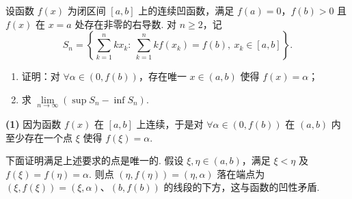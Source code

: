 设函数 $f(x)$ 为闭区间 $[a,b]$ 上的连续凹函数，满足 $f(a)=0$，$f(b)>0$ 且 $f(x)$ 在 $x=a$ 处存在非零的右导数. 对 $n\ge 2$，记
\[
  S_n=\left\{\sum_{k=1}^{n}kx_k:\ \sum_{k=1}^{n}kf(x_k)=f(b),\ x_k\in[a,b]\right\}.
\]
\begin{enumerate}
  \item 证明：对 $\forall\alpha\in(0,f(b))$，存在唯一 $x\in(a,b)$ 使得 $f(x)=\alpha$；
  \item 求 $\lim\limits_{n\to\infty}(\sup S_n-\inf S_n)$.
\end{enumerate}
\begin{solution}
\textbf{(1)} 因为函数 $f(x)$ 在 $[a,b]$ 上连续，于是对 $\forall\alpha\in(0,f(b))$ 在 $(a,b)$ 内至少存在一个点 $\xi$ 使得 $f(\xi)=\alpha$.

下面证明满足上述要求的点是唯一的. 假设 $\xi,\eta\in(a,b)$，满足 $\xi<\eta$ 及 $f(\xi)=f(\eta)=\alpha$. 则点 $(\eta,f(\eta))=(\eta,\alpha)$ 落在端点为 $(\xi,f(\xi))=(\xi,\alpha)$、$(b,f(b))$ 的线段的下方，这与函数的凹性矛盾.


\end{solution}
